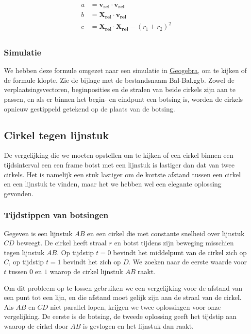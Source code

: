 \documentclass[12pt,a4paper]{article}
\begin{document}
	\begin{equation}
		\begin{aligned}
			a &= \mathbf{v_{rel}} \cdot \mathbf{v_{rel}} \\
			b &= \mathbf{X_{rel}} \cdot \mathbf{v_{rel}} \\
			c &= \mathbf{X_{rel}} \cdot \mathbf{X_{rel}} - (r_1 + r_2)^2\\
		\end{aligned}
	\end{equation}
	
	\subsubsection{Simulatie}
	We hebben deze formule omgezet naar een simulatie in \href{http://www.geogebra.org/webstart/geogebra.html}{Geogebra}, om te kijken of de formule klopte. Zie de bijlage met de bestandsnaam Bal-Bal.ggb. Zowel de verplaatsingsvectoren, beginposities en de stralen van beide cirkels zijn aan te passen, en als er binnen het begin- en eindpunt een botsing is, worden de cirkels opnieuw gestippeld getekend op de plaats van de botsing.
	
	\subsection{Cirkel tegen lijnstuk}
	De vergelijking die we moeten opstellen om te kijken of een cirkel binnen een tijdsinterval een een frame botst met een lijnstuk is lastiger dan dat van twee cirkels. Het is namelijk een stuk lastiger om de kortste afstand tussen een cirkel en een lijnstuk te vinden, maar het we hebben wel een elegante oplossing gevonden.
	
	\subsubsection{Tijdstippen van botsingen}
	Gegeven is een lijnstuk $AB$ en een cirkel die met constante snelheid over lijnstuk $CD$ beweegt. De cirkel heeft straal $r$ en botst tijdens zijn beweging misschien tegen lijnstuk $AB$. Op tijdstip $t=0$ bevindt het middelpunt van de cirkel zich op $C$, op tijdstip $t=1$ bevindt het zich op $D$. We zoeken naar de eerste waarde voor $t$ tussen $0$ en $1$ waarop de cirkel lijnstuk $AB$ raakt.
	
	Om dit probleem op te lossen gebruiken we een vergelijking voor de afstand van een punt tot een lijn, en die afstand moet gelijk zijn aan de straal van de cirkel. Als $AB$ en $CD$ niet parallel lopen, krijgen we twee oplossingen voor onze vergelijking. De eerste is de botsing, de tweede oplossing geeft het tijdstip aan waarop de cirkel door $AB$ is gevlogen en het lijnstuk dan raakt.
	
\end{document}

